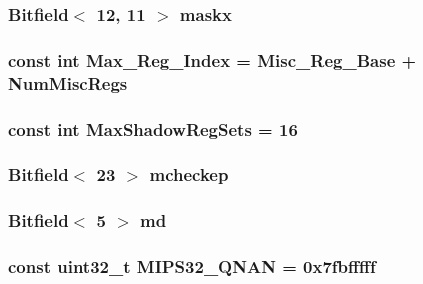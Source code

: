 \label{namespaceMipsISA_a6d232ec92c51be65510dfa67e967ff39}
\hypertarget{namespaceMipsISA_ab8afb5673e4f9abd09809ffba0490507}{
\subsubsection[{maskx}]{\setlength{\rightskip}{0pt plus 5cm}Bitfield$<$ 12, 11 $>$ {\bf maskx}}}
\label{namespaceMipsISA_ab8afb5673e4f9abd09809ffba0490507}
\hypertarget{namespaceMipsISA_a436c085ed5c04b95a1c0cbcc728c39d4}{
\subsubsection[{Max\_\-Reg\_\-Index}]{\setlength{\rightskip}{0pt plus 5cm}const int {\bf Max\_\-Reg\_\-Index} = {\bf Misc\_\-Reg\_\-Base} + {\bf NumMiscRegs}}}
\label{namespaceMipsISA_a436c085ed5c04b95a1c0cbcc728c39d4}
\hypertarget{namespaceMipsISA_abcad52ef12d61db0e043f455982e4f01}{
\subsubsection[{MaxShadowRegSets}]{\setlength{\rightskip}{0pt plus 5cm}const int {\bf MaxShadowRegSets} = 16}}
\label{namespaceMipsISA_abcad52ef12d61db0e043f455982e4f01}
\hypertarget{namespaceMipsISA_a572d975ede660ebdf7718dcd5d05f6f4}{
\subsubsection[{mcheckep}]{\setlength{\rightskip}{0pt plus 5cm}Bitfield$<$ 23 $>$ {\bf mcheckep}}}
\label{namespaceMipsISA_a572d975ede660ebdf7718dcd5d05f6f4}
\hypertarget{namespaceMipsISA_aed4c6005f91b7fdeeca47124687f1674}{
\subsubsection[{md}]{\setlength{\rightskip}{0pt plus 5cm}Bitfield$<$ 5 $>$ {\bf md}}}
\label{namespaceMipsISA_aed4c6005f91b7fdeeca47124687f1674}
\hypertarget{namespaceMipsISA_ade780efa968a53a892f8bd18ca98f768}{
\subsubsection[{MIPS32\_\-QNAN}]{\setlength{\rightskip}{0pt plus 5cm}const {\bf uint32\_\-t} {\bf MIPS32\_\-QNAN} = 0x7fbfffff}}
